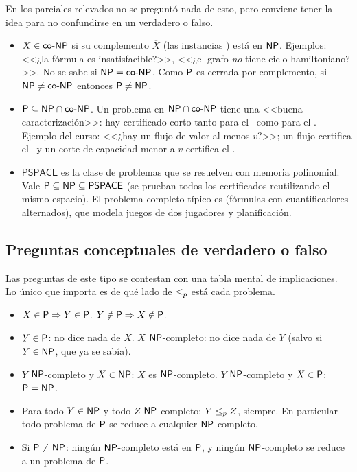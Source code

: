En los parciales relevados no se preguntó nada de esto, pero conviene tener la idea para no confundirse en un verdadero o falso.

\begin{itemize}
  \item $X\in\mathsf{co}\text{-}\mathsf{NP}$ si su complemento $\overline{X}$ (las instancias \npno) está en $\mathsf{NP}$. Ejemplos: <<¿la fórmula es insatisfacible?>>, <<¿el grafo \emph{no} tiene ciclo hamiltoniano?>>. No se sabe si $\mathsf{NP}=\mathsf{co}\text{-}\mathsf{NP}$. Como $\mathsf{P}$ es cerrada por complemento, si $\mathsf{NP}\ne\mathsf{co}\text{-}\mathsf{NP}$ entonces $\mathsf{P}\ne\mathsf{NP}$.
  \item $\mathsf{P}\subseteq\mathsf{NP}\cap\mathsf{co}\text{-}\mathsf{NP}$. Un problema en $\mathsf{NP}\cap\mathsf{co}\text{-}\mathsf{NP}$ tiene una <<buena caracterización>>: hay certificado corto tanto para el \npsi\ como para el \npno. Ejemplo del curso: <<¿hay un flujo de valor al menos $v$?>>; un flujo certifica el \npsi\ y un corte de capacidad menor a $v$ certifica el \npno.
  \item $\mathsf{PSPACE}$ es la clase de problemas que se resuelven con memoria polinomial. Vale $\mathsf{P}\subseteq\mathsf{NP}\subseteq\mathsf{PSPACE}$ (se prueban todos los certificados reutilizando el mismo espacio). El problema completo típico es  (fórmulas con cuantificadores alternados), que modela juegos de dos jugadores y planificación.
\end{itemize}

\subsection{Preguntas conceptuales de verdadero o falso}

Las preguntas de este tipo se contestan con una tabla mental de implicaciones. Lo único que importa es de qué lado de $\le_{p}$ está cada problema.

\begin{resultado}
\begin{itemize}
  \item $X\in\mathsf{P}\Rightarrow Y\in\mathsf{P}$. \quad $Y\notin\mathsf{P}\Rightarrow X\notin\mathsf{P}$.
  \item $Y\in\mathsf{P}$: no dice nada de $X$. \quad $X$ $\mathsf{NP}$-completo: no dice nada de $Y$ (salvo si $Y\in\mathsf{NP}$, que ya se sabía).
  \item $Y$ $\mathsf{NP}$-completo y $X\in\mathsf{NP}$: $X$ es $\mathsf{NP}$-completo. \quad $Y$ $\mathsf{NP}$-completo y $X\in\mathsf{P}$: $\mathsf{P}=\mathsf{NP}$.
  \item Para todo $Y\in\mathsf{NP}$ y todo $Z$ $\mathsf{NP}$-completo: $Y\le_{p} Z$, siempre. En particular todo problema de $\mathsf{P}$ se reduce a cualquier $\mathsf{NP}$-completo.
  \item Si $\mathsf{P}\ne\mathsf{NP}$: ningún $\mathsf{NP}$-completo está en $\mathsf{P}$, y ningún $\mathsf{NP}$-completo se reduce a un problema de $\mathsf{P}$.
\end{itemize}
\end{resultado}

